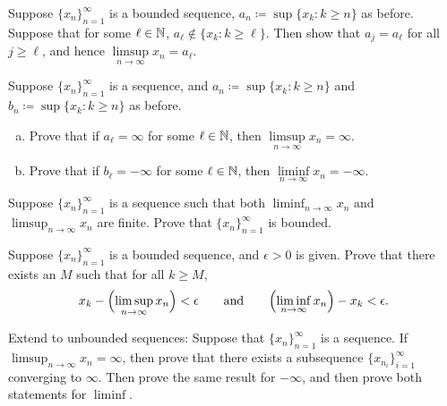 \begin{exercise}
Suppose $\{ x_n \}_{n=1}^\infty$ is a bounded sequence, $a_n \coloneqq \sup \{ x_k : k \geq n \}$
as before.  Suppose that for some $\ell \in {\mathbb{N}}$,
$a_\ell \notin \{ x_k : k \geq \ell \}$.  Then show that $a_j = a_\ell$ for all $j \geq \ell$, and hence
$\limsup\limits_{n\to\infty} x_n = a_\ell$.
\end{exercise}

\begin{exercise}
Suppose $\{ x_n \}_{n=1}^\infty$ is a sequence,
and $a_n \coloneqq \sup \{ x_k : k \geq n \}$ and
$b_n \coloneqq \sup \{ x_k : k \geq n \}$ as before.
\begin{enumerate}[a)]
\item
Prove that if $a_\ell = \infty$ for some $\ell \in {\mathbb{N}}$, then 
$\limsup\limits_{n\to\infty} x_n = \infty$.
\item
Prove that if $b_\ell = -\infty$ for some $\ell \in {\mathbb{N}}$, then 
$\liminf\limits_{n\to\infty} x_n = -\infty$.
\end{enumerate}
\end{exercise}

\begin{exercise}
Suppose $\{ x_n \}_{n=1}^\infty$ is a sequence
such that both $\liminf_{n\to\infty} x_n$ and
$\limsup_{n\to\infty} x_n$  are finite.  Prove that $\{ x_n \}_{n=1}^\infty$ is bounded.
\end{exercise}

\begin{exercise}
Suppose $\{ x_n \}_{n=1}^\infty$ is a bounded sequence, and $\epsilon > 0$ is given.
Prove that there exists an $M$ such that for all $k \geq M$,
\begin{equation*}
x_k - \Bigl(\limsup_{n\to\infty} x_n\Bigr) < \epsilon \qquad \text{and} \qquad
\Bigl(\liminf_{n\to\infty} x_n\Bigr) - x_k < \epsilon .
\end{equation*}
\end{exercise}

\begin{exercise} \label{exercise:extendsubseqlimsupinf}
Extend  to unbounded sequences:
Suppose that $\{ x_n \}_{n=1}^\infty$ is a sequence.
If $\limsup_{n\to\infty} x_n = \infty$, then prove that
there exists a subsequence $\{ x_{n_i} \}_{i=1}^\infty$ converging to $\infty$.
Then prove the same result for $-\infty$, and then prove both statements for
$\liminf$.
\end{exercise}



